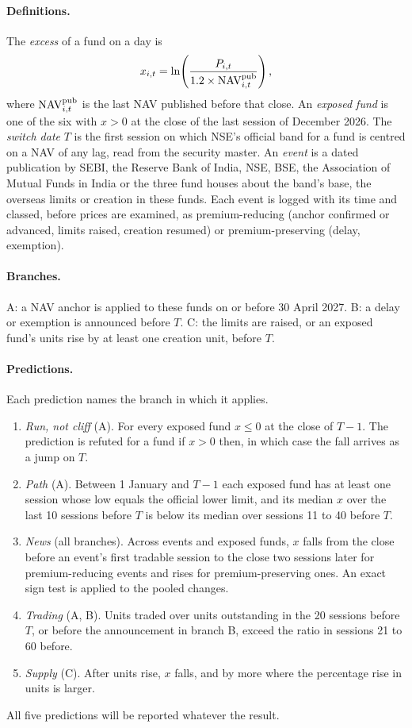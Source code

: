 \paragraph{Definitions.} The \emph{excess} of a fund on a day is
\begin{equation}\label{eq:xapril}
x_{i,t}=\ln\!\left(\frac{P_{i,t}}{1.2\times\mathrm{NAV}^{\mathrm{pub}}_{i,t}}\right),
\end{equation}
where $\mathrm{NAV}^{\mathrm{pub}}_{i,t}$ is the last NAV published before that close. An \emph{exposed fund} is one of the six with $x>0$ at the close of the last session of December 2026. The \emph{switch date} $T$ is the first session on which NSE's official band for a fund is centred on a NAV of any lag, read from the security master. An \emph{event} is a dated publication by SEBI, the Reserve Bank of India, NSE, BSE, the Association of Mutual Funds in India or the three fund houses about the band's base, the overseas limits or creation in these funds. Each event is logged with its time and classed, before prices are examined, as premium-reducing (anchor confirmed or advanced, limits raised, creation resumed) or premium-preserving (delay, exemption).

\paragraph{Branches.} A: a NAV anchor is applied to these funds on or before 30 April 2027. B: a delay or exemption is announced before $T$. C: the limits are raised, or an exposed fund's units rise by at least one creation unit, before $T$.

\paragraph{Predictions.} Each prediction names the branch in which it applies.\nopagebreak
\begin{enumerate}
\item \emph{Run, not cliff} (A). For every exposed fund $x\le 0$ at the close of $T-1$. The prediction is refuted for a fund if $x>0$ then, in which case the fall arrives as a jump on $T$.
\item \emph{Path} (A). Between 1 January and $T-1$ each exposed fund has at least one session whose low equals the official lower limit, and its median $x$ over the last 10 sessions before $T$ is below its median over sessions 11 to 40 before $T$.
\item \emph{News} (all branches). Across events and exposed funds, $x$ falls from the close before an event's first tradable session to the close two sessions later for premium-reducing events and rises for premium-preserving ones. An exact sign test is applied to the pooled changes.
\item \emph{Trading} (A, B). Units traded over units outstanding in the 20 sessions before $T$, or before the announcement in branch B, exceed the ratio in sessions 21 to 60 before.
\item \emph{Supply} (C). After units rise, $x$ falls, and by more where the percentage rise in units is larger.
\end{enumerate}
All five predictions will be reported whatever the result.

